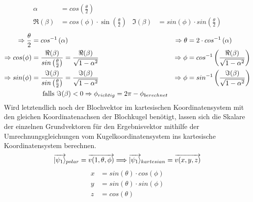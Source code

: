 \documentclass[12pt]{report}
\begin{document}
	\begin{align}
		 \alpha &= cos\left(\tfrac{\theta}{2}\right) \\
		 \Re(\beta) &= cos(\phi)\cdot\sin\left(\tfrac{\theta}{2}\right) & \Im(\beta) &= sin(\phi)\cdot sin\left(\tfrac{\theta}{2}\right)
	\end{align}
	\vspace{-0.5cm}
	\begin{align*}
		 \Rightarrow \frac{\theta}{2} &= cos^{-1}\left( \alpha \right) & \Rightarrow \theta &= 2\cdot cos^{-1}\left( \alpha \right) \\
		 \Rightarrow cos(\phi) &= \frac{\Re(\beta)}{sin\left( \frac{\theta}{2} \right)} = \frac{\Re(\beta)}{\sqrt{1-\alpha^2}} & \Rightarrow \phi &= cos^{-1}\left( \frac{\Re(\beta)}{\sqrt{1-\alpha^2}} \right)\\
		 \Rightarrow sin(\phi) &= \frac{\Im(\beta)}{sin\left( \frac{\theta}{2} \right)} = \frac{\Im(\beta)}{\sqrt{1-\alpha^2}} & \Rightarrow \phi &= sin^{-1}\left( \frac{\Im(\beta)}{\sqrt{1-\alpha^2}} \right)\\
		 & \text{\hspace{0.45cm} falls } \Im(\beta)<0\Rightarrow\phi_{richtig} = 2 \pi - \phi_{berechnet}
	\end{align*}
	Wird letztendlich noch der Blochvektor im kartesischen Koordinatensystem mit den gleichen Koordinatenachsen der Blochkugel benötigt, lassen sich die Skalare der einzelnen Grundvektoren für den Ergebnisvektor mithilfe der Umrechnungsgleichungen vom Kugelkoordinatensystem ins kartesische Koordinatensystem berechnen.
		\[ \overrightarrow{\ket{\psi_1}}_{polar} = \overrightarrow{v(1,\theta,\phi)} \Longrightarrow \overrightarrow{\ket{\psi_1}}_{kartesian} = \overrightarrow{v(x,y,z)} \]
		\vspace{-1cm}
	\begin{align*}
		 x &= sin(\theta)\cdot cos(\phi)\\
		 y &= sin(\theta)\cdot sin(\phi)\\
		 z &= cos(\theta)
	\end{align*}
\end{document}
